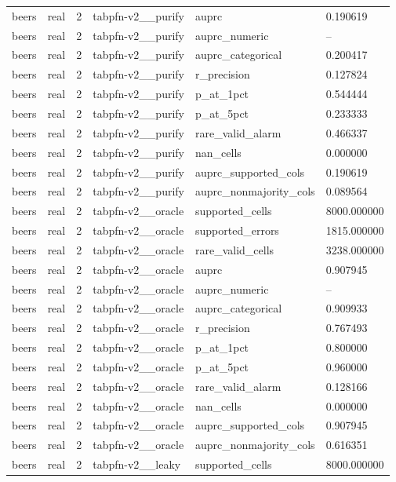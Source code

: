\begin{tabular}{llllll}
beers & real & 2 & tabpfn-v2\_\_purify & auprc & 0.190619 \\
beers & real & 2 & tabpfn-v2\_\_purify & auprc\_numeric & -- \\
beers & real & 2 & tabpfn-v2\_\_purify & auprc\_categorical & 0.200417 \\
beers & real & 2 & tabpfn-v2\_\_purify & r\_precision & 0.127824 \\
beers & real & 2 & tabpfn-v2\_\_purify & p\_at\_1pct & 0.544444 \\
beers & real & 2 & tabpfn-v2\_\_purify & p\_at\_5pct & 0.233333 \\
beers & real & 2 & tabpfn-v2\_\_purify & rare\_valid\_alarm & 0.466337 \\
beers & real & 2 & tabpfn-v2\_\_purify & nan\_cells & 0.000000 \\
beers & real & 2 & tabpfn-v2\_\_purify & auprc\_supported\_cols & 0.190619 \\
beers & real & 2 & tabpfn-v2\_\_purify & auprc\_nonmajority\_cols & 0.089564 \\
beers & real & 2 & tabpfn-v2\_\_oracle & supported\_cells & 8000.000000 \\
beers & real & 2 & tabpfn-v2\_\_oracle & supported\_errors & 1815.000000 \\
beers & real & 2 & tabpfn-v2\_\_oracle & rare\_valid\_cells & 3238.000000 \\
beers & real & 2 & tabpfn-v2\_\_oracle & auprc & 0.907945 \\
beers & real & 2 & tabpfn-v2\_\_oracle & auprc\_numeric & -- \\
beers & real & 2 & tabpfn-v2\_\_oracle & auprc\_categorical & 0.909933 \\
beers & real & 2 & tabpfn-v2\_\_oracle & r\_precision & 0.767493 \\
beers & real & 2 & tabpfn-v2\_\_oracle & p\_at\_1pct & 0.800000 \\
beers & real & 2 & tabpfn-v2\_\_oracle & p\_at\_5pct & 0.960000 \\
beers & real & 2 & tabpfn-v2\_\_oracle & rare\_valid\_alarm & 0.128166 \\
beers & real & 2 & tabpfn-v2\_\_oracle & nan\_cells & 0.000000 \\
beers & real & 2 & tabpfn-v2\_\_oracle & auprc\_supported\_cols & 0.907945 \\
beers & real & 2 & tabpfn-v2\_\_oracle & auprc\_nonmajority\_cols & 0.616351 \\
beers & real & 2 & tabpfn-v2\_\_leaky & supported\_cells & 8000.000000 \\

\end{tabular}
